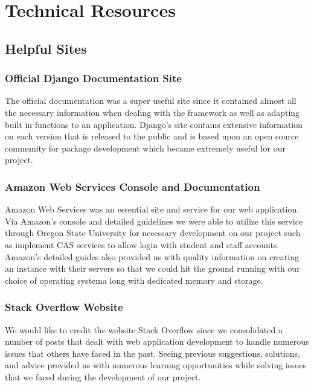 \section{Technical Resources}
    \subsection{Helpful Sites}
    \subsubsection{Official Django Documentation Site}
    \noindent The official documentation was a super useful site since it contained almost all the necessary information when dealing with the framework as well as adapting built in functions to an application. Django's site contains extensive information on each version that is released to the public and is based upon an open source community for package development which became extremely useful for our project.\\
    
    \subsubsection{Amazon Web Services Console and Documentation}
    \noindent Amazon Web Services was an essential site and service for our web application. Via Amazon's console and detailed guidelines we were able to utilize this service through Oregon State University for necessary development on our project such as implement CAS services to allow login with student and staff accounts. Amazon's detailed guides also provided us with quality information on creating an instance with their servers so that we could hit the ground running with our choice of operating systema long with dedicated memory and storage.\\
    
    \subsubsection{Stack Overflow Website}
    \noindent We would like to credit the website Stack Overflow since we consolidated a number of posts that dealt with web application development to handle numerous issues that others have faced in the past. Seeing previous suggestions, solutions, and advice provided us with numerous learning opportunities while solving issues that we faced during the development of our project. 
    
